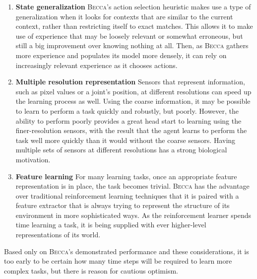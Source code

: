 \begin{enumerate} 
\item {\bf State generalization} \textsc{Becca}'s action selection heuristic makes use a type of generalization when it looks for contexts that are similar to the current context, rather than restricting itself to exact matches. This allows it to make use of experience that may be loosely relevant or somewhat erroneous, but still a big improvement over knowing nothing at all. Then, as \textsc{Becca} gathers more experience and populates its model more densely, it can rely on increasingly relevant experience as it chooses actions.
\item {\bf Multiple resolution representation} Sensors that represent information, such as pixel values or a joint's position, at different resolutions can speed up the learning process as well. Using the coarse information, it may be possible to learn to perform a task quickly and robustly, but poorly. However, the ability to perform poorly provides a great head start to learning using the finer-resolution sensors, with the result that the agent learns to perform the task well more quickly than it would without the coarse sensors. Having multiple sets of sensors at different resolutions has a strong biological motivation.
\item {\bf Feature learning} For many learning tasks, once an appropriate feature representation is in place, the task becomes trivial. \textsc{Becca} has the advantage over traditional reinforcement learning techniques that it is paired with a feature extractor that is always trying to represent the structure of its environment in more sophisticated ways. As the reinforcement learner spends time learning a task, it is being supplied with ever higher-level representations of its world.
\end{enumerate}

Based only on \textsc{Becca}'s demonstrated performance and these considerations, it is too early to be certain how many time steps will be required to learn more complex tasks, but there is reason for cautious optimism. 
